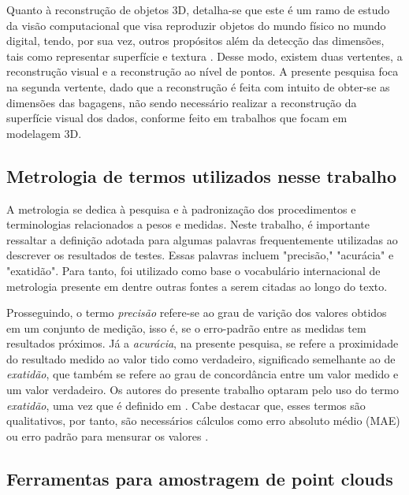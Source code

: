     Quanto à reconstrução de objetos 3D, detalha-se que este é um ramo de estudo da visão computacional que visa reproduzir objetos do mundo físico no mundo digital, tendo, por sua vez, outros propósitos além da detecção das dimensões, tais como representar superfície e textura \cite{warnett_2016_towards, chen_2013_research}. Desse modo, existem duas vertentes, a reconstrução visual e a reconstrução ao nível de pontos. A presente pesquisa foca na segunda vertente, dado que a reconstrução é feita com intuito de obter-se as dimensões das bagagens, não sendo necessário realizar a reconstrução da superfície visual dos dados, conforme feito em trabalhos que focam em modelagem 3D. 



\subsection{Metrologia de termos utilizados nesse trabalho}
\label{subsec_Metrologia de termos utilizados nesse trabalho}
    
    A metrologia se dedica à pesquisa e à padronização dos procedimentos e terminologias relacionados a pesos e medidas. Neste trabalho, é importante ressaltar a definição adotada para algumas palavras frequentemente utilizadas ao descrever os resultados de testes. Essas palavras incluem "precisão," "acurácia" e "exatidão". Para tanto, foi utilizado como base o vocabulário internacional de metrologia presente em \cite{gov_2022_documentos} dentre outras fontes a serem citadas ao longo do texto.

    Prosseguindo, o termo \textit{precisão} refere-se ao grau de varição dos valores obtidos em um conjunto de medição, isso é, se o erro-padrão entre as medidas tem resultados próximos. Já a \textit{acurácia}, na presente pesquisa, se refere a proximidade do resultado medido ao valor tido como verdadeiro, significado semelhante ao de \textit{exatidão}, que também se refere ao grau de concordância entre um valor medido e um valor verdadeiro. Os autores do presente trabalho optaram pelo uso do termo \textit{exatidão}, uma vez que é definido em . Cabe destacar que, esses termos são qualitativos, por tanto, são necessários cálculos como erro absoluto médio (MAE) ou erro padrão para mensurar os valores \cite{gov_2022_documentos, zrhans_2018_acurcia}. 
    


\subsection{Ferramentas para amostragem de point clouds}
\label{sec_ferramentas para amostragem de point clouds}

